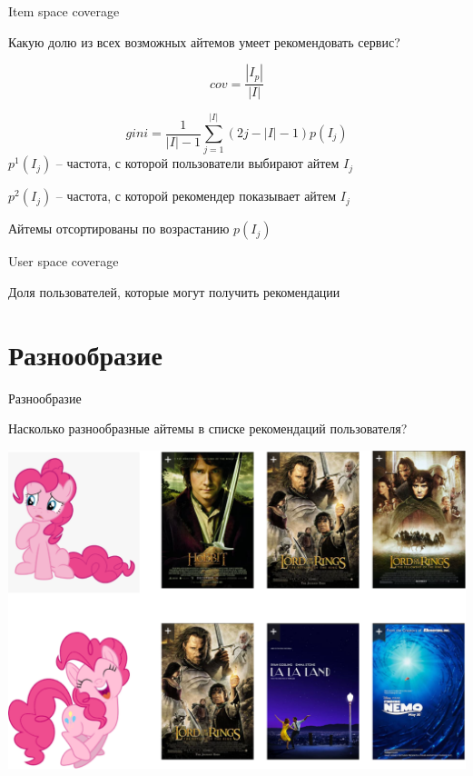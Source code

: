 \documentclass[11pt,aspectratio=169,handout]{beamer}
\begin{document}
\begin{frame}{Item space coverage}

\begin{tcolorbox}[colback=info!5,colframe=info!80,title=]
Какую долю из всех возможных айтемов умеет рекомендовать сервис?
\end{tcolorbox}

\[
cov = \frac{| I_p |}{| I |}
\]

\[
gini = \frac{1}{| I | - 1} \sum_{j=1}^{| I |}(2 j - | I | - 1) p(I_j)
\]
$p^1(I_j)$ -- частота, с которой пользователи выбирают айтем $I_j$ 

$p^2(I_j)$ -- частота, с которой рекомендер показывает айтем $I_j$ 

Айтемы отсортированы по возрастанию $p(I_j)$ 

\end{frame}

\begin{frame}{User space coverage}

\begin{tcolorbox}[colback=info!5,colframe=info!80,title=]
Доля пользователей, которые могут получить рекомендации
\end{tcolorbox}

\end{frame}

\section{Разнообразие}

\begin{frame}{Разнообразие \cite{KUNAVER}}

\begin{tcolorbox}[colback=info!5,colframe=info!80,title=]
[diversity] Насколько разнообразные айтемы в списке рекомендаций пользователя?
\end{tcolorbox}

\begin{center}
\includegraphics[scale=0.2]{images/diversity.png}
\end{center}

\end{frame}
\end{document}
